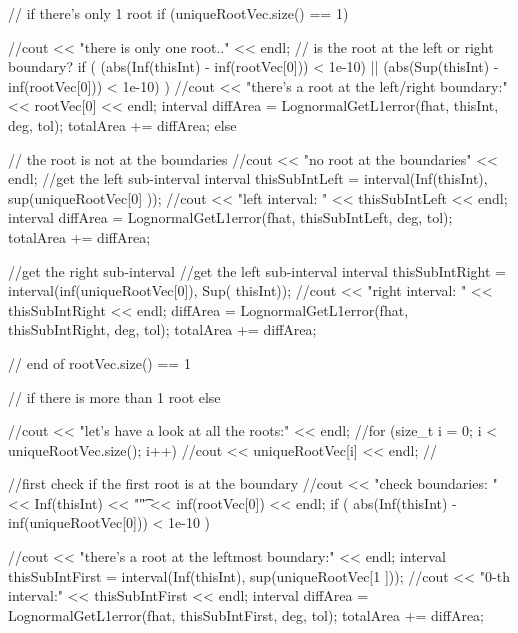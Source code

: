 \begin{DoxyCode}
{{{      // if there's only 1 root
      if (uniqueRootVec.size() == 1) {
        //cout << "there is only one root.." << endl;
        // is the root at the left or right boundary?
        if ( (abs(Inf(thisInt) - inf(rootVec[0])) < 1e-10) || 
            (abs(Sup(thisInt) - inf(rootVec[0])) < 1e-10) ) {
          //cout << "there's a root at the left/right boundary:" << rootVec[0]
       << endl;
          interval diffArea = LognormalGetL1error(fhat, thisInt, deg, tol);
          totalArea += diffArea;
        }
        else { // the root is not at the boundaries
          //cout << "no root at the boundaries" << endl;
          //get the left sub-interval
          interval thisSubIntLeft = interval(Inf(thisInt), sup(uniqueRootVec[0]
      ));
          //cout << "left interval: " << thisSubIntLeft << endl; 
          interval diffArea = LognormalGetL1error(fhat, thisSubIntLeft, deg, 
      tol);
          totalArea += diffArea;
          
          //get the right sub-interval
          //get the left sub-interval
          interval thisSubIntRight = interval(inf(uniqueRootVec[0]), Sup(
      thisInt));
          //cout << "right interval: " << thisSubIntRight << endl; 
          diffArea = LognormalGetL1error(fhat, thisSubIntRight, deg, tol);
          totalArea += diffArea;
        }
      } // end of rootVec.size() == 1

        // if there is more than 1 root
      else {
        //cout << "let's have a look at all the roots:" << endl;
        //for (size_t i = 0; i < uniqueRootVec.size(); i++) {
          //cout << uniqueRootVec[i] << endl;
        //}

        //first check if the first root is at the boundary
        //cout << "check boundaries: " << Inf(thisInt) << "\t" <<
       inf(rootVec[0]) << endl;
        if ( abs(Inf(thisInt) - inf(uniqueRootVec[0])) < 1e-10 ) {
          //cout << "there's a root at the leftmost boundary:" << endl;
          interval thisSubIntFirst = interval(Inf(thisInt), sup(uniqueRootVec[1
      ]));
          //cout << "0-th interval:" << thisSubIntFirst << endl; 
          interval diffArea = LognormalGetL1error(fhat, thisSubIntFirst, deg, 
      tol);
          totalArea += diffArea;
          
}}}}}
\end{DoxyCode}
